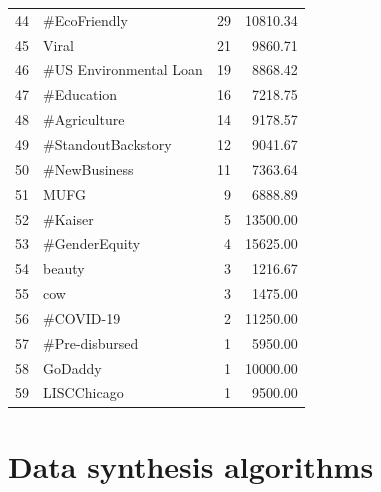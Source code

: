 \begin{longtable}{|c|l|r|r|}
   44 &                    \#EcoFriendly &             29 &             10810.34 \\
   45 &                           Viral &             21 &              9860.71 \\
   46 &          \#US Environmental Loan &             19 &              8868.42 \\
   47 &                      \#Education &             16 &              7218.75 \\
   48 &                    \#Agriculture &             14 &              9178.57 \\
   49 &              \#StandoutBackstory &             12 &              9041.67 \\
   50 &                    \#NewBusiness &             11 &              7363.64 \\
   51 &                            MUFG &              9 &              6888.89 \\
   52 &                         \#Kaiser &              5 &             13500.00 \\
   53 &                   \#GenderEquity &              4 &             15625.00 \\
   54 &                          beauty &              3 &              1216.67 \\
   55 &                             cow &              3 &              1475.00 \\
   56 &                       \#COVID-19 &              2 &             11250.00 \\
   57 &                  \#Pre-disbursed &              1 &              5950.00 \\
   58 &                         GoDaddy &              1 &             10000.00 \\
   59 &                     LISCChicago &              1 &              9500.00 \\

\end{longtable}



\chapter{Data synthesis algorithms}

